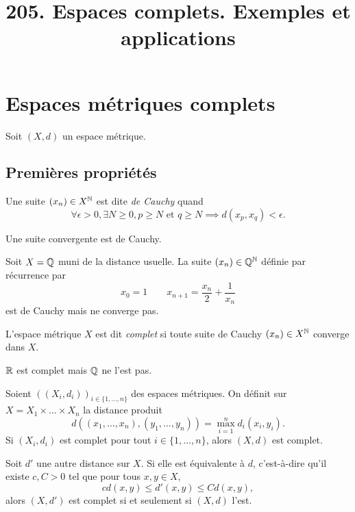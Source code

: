 \documentclass[twocolumn, landscape]{article}
\title{205. Espaces complets. Exemples et applications}
\begin{document}
\section{Espaces métriques complets}
Soit $(X, d)$ un espace métrique.

\subsection{Premières propriétés \cite{GouAna}}

\begin{defi}
    Une suite $(x_n) \in X^{\mathbb{N}}$ est dite \emph{de Cauchy} quand
    $$\forall \epsilon > 0, \exists N \geq 0, p \geq N \text{ et } q \geq N \implies d(x_p, x_q) < \epsilon.$$
\end{defi}

\begin{prop}
    Une suite convergente est de Cauchy. 
\end{prop}

\begin{exem}
    Soit $X= \mathbb{Q}$ muni de la distance usuelle. La suite $(x_n) \in \mathbb{Q}^{\mathbb{N}}$ définie par récurrence par $$x_0 = 1 \qquad x_{n+1} = \frac{x_n}{2} + \frac{1}{x_n}$$
    est de Cauchy mais ne converge pas.
\end{exem}

\begin{defi}
    L'espace métrique $X$ est dit \emph{complet} si toute suite de Cauchy $(x_n) \in X^{\mathbb{N}}$ converge dans $X$.
\end{defi}

\begin{prop}
    $\mathbb{R}$ est complet mais $\mathbb{Q}$ ne l'est pas. 
\end{prop}

\begin{prop}
    Soient $((X_i, d_i))_{i \in \{1, \dots, n\}}$ des espaces métriques. On définit sur $X= X_1 \times \dots \times X_n$ la distance produit 
    $$d((x_1, \dots, x_n), (y_1, \dots, y_n)) = \max_{i=1}^n d_i(x_i, y_i).$$
    Si $(X_i, d_i)$ est complet pour tout $i \in \{1, \dots, n\}$, alors $(X,d)$ est complet. 
\end{prop}

\begin{prop}
    Soit $d'$ une autre distance sur $X$. Si elle est équivalente à $d$, c'est-à-dire qu'il existe $c, C>0$ tel que pour tous $x,y \in X$, $$c d(x,y) \leq d'(x,y) \leq C d(x,y),$$
    alors $(X,d')$ est complet si et seulement si $(X,d)$ l'est. 
\end{prop}
\end{document}
